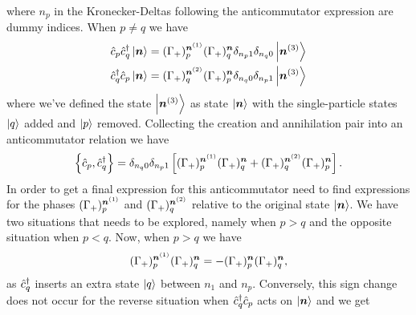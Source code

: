             where $n_p$ in the Kronecker-Deltas following the anticommutator
            expression are dummy indices.
            When $p \neq q$ we have
            \begin{align}
                \hat{c}_{p}\hat{c}_{q}^{\dagger}\ket{\boldsymbol{n}}
                &=
                (\Gamma_{+})^{\boldsymbol{n}^{(1)}}_{p}
                (\Gamma_{+})^{\boldsymbol{n}}_{q}
                \delta_{n_p 1} \delta_{n_q 0}
                \ket{\boldsymbol{n}^{(3)}}
                \\
                \hat{c}_{q}^{\dagger}\hat{c}_{p}\ket{\boldsymbol{n}}
                &=
                (\Gamma_{+})^{\boldsymbol{n}^{(2)}}_{q}
                (\Gamma_{+})^{\boldsymbol{n}}_{p}
                \delta_{n_q 0} \delta_{n_p 1}
                \ket{\boldsymbol{n}^{(3)}}
            \end{align}
            where we've defined the state $\ket{\boldsymbol{n}^{(3)}}$ as state
            $\ket{\boldsymbol{n}}$ with the single-particle states $\ket{q}$ added and
            $\ket{p}$ removed.
            Collecting the creation and annihilation pair into an anticommutator
            relation we have
            \begin{align}
                \left\{\hat{c}_{p}, \hat{c}_{q}^{\dagger}\right\}
                =
                \delta_{n_q 0} \delta_{n_p 1}
                \left[ 
                    (\Gamma_{+})^{\boldsymbol{n}^{(1)}}_{p}
                    (\Gamma_{+})^{\boldsymbol{n}}_{q}
                    +
                    (\Gamma_{+})^{\boldsymbol{n}^{(2)}}_{q}
                    (\Gamma_{+})^{\boldsymbol{n}}_{p}
                 \right].
            \end{align}
            In order to get a final expression for this anticommutator need to
            find expressions for the phases $(\Gamma_{+})^{\boldsymbol{n}^{(1)}}_{p}$
            and $(\Gamma_{+})^{\boldsymbol{n}^{(2)}}_{q}$ relative to the original
            state $\ket{\boldsymbol{n}}$.
            We have two situations that needs to be explored, namely when $p >
            q$ and the opposite situation when $p < q$.
            Now, when $p > q$ we have
            \begin{align}
                (\Gamma_{+})^{\boldsymbol{n}^{(1)}}_{p}
                (\Gamma_{+})^{\boldsymbol{n}}_{q}
                =
                -
                (\Gamma_{+})^{\boldsymbol{n}}_{p}
                (\Gamma_{+})^{\boldsymbol{n}}_{q},
            \end{align}
            as $\hat{c}_{q}^{\dagger}$ inserts an extra state $\ket{q}$ between $n_1$ and
            $n_p$.
            Conversely, this sign change does not occur for the reverse
            situation when $\hat{c}_{q}^{\dagger}\hat{c}_{p}$ acts on $\ket{\boldsymbol{n}}$ and we get
